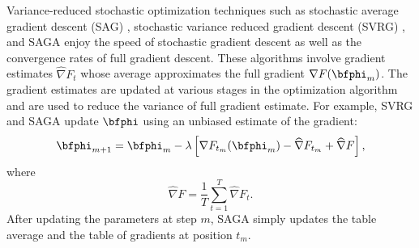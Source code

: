 Variance-reduced stochastic optimization techniques such as stochastic average gradient descent (SAG) \citep{Schmidt:2017}, stochastic variance reduced gradient descent (SVRG) \citep{Johnson:2013}, and SAGA \citep{Defazio:2014} enjoy the speed of stochastic gradient descent as well as the convergence rates of full gradient descent. These algorithms involve gradient estimates $\widehat \nabla F_t$ whose average approximates the full gradient $\nabla F(\bfphi_{m})$. The gradient estimates are updated at various stages in the optimization algorithm and are used to reduce the variance of full gradient estimate. 
%
%
For example, SVRG and SAGA update $\bfphi$ using an unbiased estimate of the gradient:
%
\begin{equation}
    \bfphi_{m+1} = \bfphi_{m} - \lambda \left[\nabla F_{t_{m}}(\bfphi_{m}) - \widehat \nabla F_{t_{m}} + \widehat \nabla F \right],
    \label{eqn:SAGA_update}
\end{equation}
%
where
%
\begin{equation}
    \widehat \nabla F = \frac{1}{T} \sum_{t=1}^T \widehat \nabla F_{t}.
    \label{eqn:tbl_avg}
\end{equation}
%
%
After updating the parameters at step $m$, SAGA simply updates the table average and the table of gradients at position $t_{m}$.
